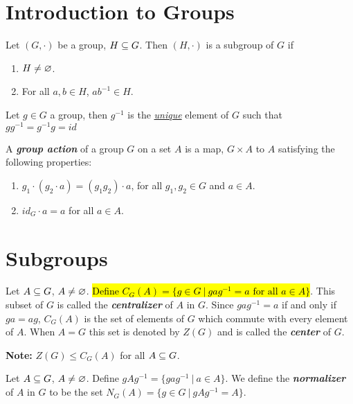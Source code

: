 \section{Introduction to Groups}
\begin{thm}
Let $(G,\cdot)$ be a group, $H\subseteq G$. Then $(H,\cdot)$ is a subgroup of $G$ if
\begin{enumerate}
\item $H\neq \varnothing$.
\item For all $a,b\in H$, $ab^{-1}\in H$.
\end{enumerate}
\end{thm}

\nl
\begin{defn}
Let $g\in G$ a group, then $g^{-1}$ is the \underline{\textit{unique}} element of $G$ such that $gg^{-1}=g^{-1}g=id$
\end{defn}

\nl
\begin{defn}
A \textbf{\textit{group action}} of a group $G$ on a set $A$ is a map, $G\times A$ to $A$ satisfying the following properties:
\begin{enumerate}
\item $g_1\cdot(g_2\cdot a) = (g_1g_2)\cdot a$, for all $g_1,g_2\in G$ and $a\in A$.
\item $id_G\cdot a = a$ for all $a\in A$.
\end{enumerate}
\end{defn}


\section{Subgroups}

\setcounter{thm}{0}
\nl
\begin{defn}
Let $A\subseteq G$, $A\neq\varnothing$. \hl{Define $C_G(A) = \{g\in G\ |\ gag^{-1} = a \text{ for all } a\in A\}$}. This subset of $G$ is called the \textbf{\textit{centralizer}} of $A$ in $G$. Since $gag^{-1} = a$ if and only if $ga = ag$, $C_G(A)$ is the set of elements of $G$ which commute with every element of $A$. When $A = G$ this set is denoted by $Z(G)$ and is called the \textit{\textbf{center}} of $G$.
\end{defn}
\nl

\textbf{Note:} $Z(G) \leq C_G(A)$ for all $A\subseteq G$.

\nl

\begin{defn}
Let $A\subseteq G$, $A\neq\varnothing$. Define $gAg^{-1} = \{gag^{-1}\ |\ a\in A\}$. We define the \textit{\textbf{normalizer}} of $A$ in $G$ to be the set $N_G(A) = \{g\in G\ |\ gAg^{-1} = A\}$.
\end{defn}
\nl


